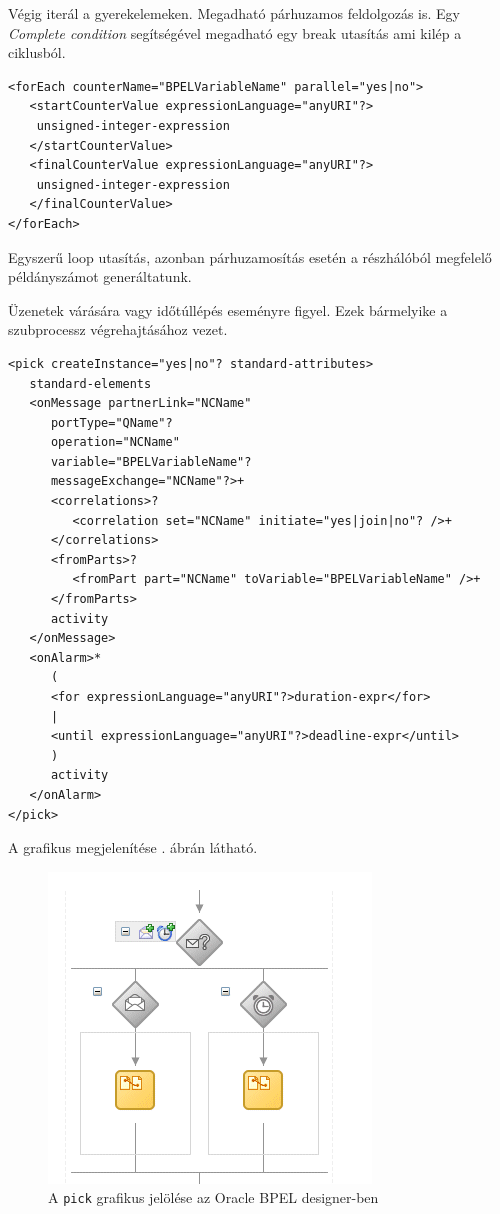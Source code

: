 Végig iterál a gyerekelemeken. Megadható párhuzamos feldolgozás is. Egy \textit{Complete condition} segítségével megadható egy break utasítás ami kilép a ciklusból. 
\begin{verbatim}
<forEach counterName="BPELVariableName" parallel="yes|no">
   <startCounterValue expressionLanguage="anyURI"?>
  	unsigned-integer-expression
   </startCounterValue>
   <finalCounterValue expressionLanguage="anyURI"?>
  	unsigned-integer-expression
   </finalCounterValue>
</forEach>
\end{verbatim}
Egyszerű loop utasítás, azonban párhuzamosítás esetén a részhálóból megfelelő példányszámot generáltatunk. 

Üzenetek várására vagy időtúllépés eseményre figyel. Ezek bármelyike a szubprocessz végrehajtásához vezet. 
\begin{verbatim}
<pick createInstance="yes|no"? standard-attributes>
   standard-elements
   <onMessage partnerLink="NCName"
      portType="QName"?
      operation="NCName"
      variable="BPELVariableName"?
      messageExchange="NCName"?>+
      <correlations>?
         <correlation set="NCName" initiate="yes|join|no"? />+
      </correlations>
      <fromParts>?
         <fromPart part="NCName" toVariable="BPELVariableName" />+
      </fromParts>
      activity
   </onMessage>
   <onAlarm>*
      (
      <for expressionLanguage="anyURI"?>duration-expr</for>
      |
      <until expressionLanguage="anyURI"?>deadline-expr</until>
      )
      activity
   </onAlarm>
</pick>
\end{verbatim}
A grafikus megjelenítése . ábrán látható.

\begin{figure}[h!]
\centering
\includegraphics[scale=1]{images/pick.png}
\caption{A \texttt{pick} grafikus jelölése az Oracle BPEL designer-ben}
\label{fig:pick}
\end{figure}


